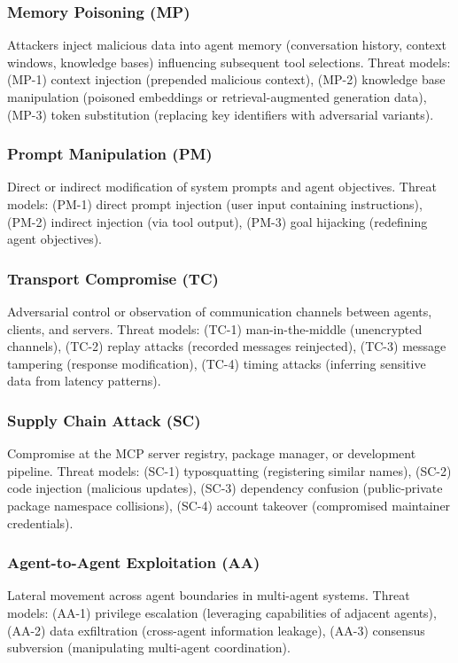 \documentclass[12pt,twocolumn,journal]{IEEEtran}
\begin{document}
\subsubsection{Memory Poisoning (MP)}
Attackers inject malicious data into agent memory (conversation history, context windows, knowledge bases) influencing subsequent tool selections. Threat models: (MP-1) context injection (prepended malicious context), (MP-2) knowledge base manipulation (poisoned embeddings or retrieval-augmented generation data), (MP-3) token substitution (replacing key identifiers with adversarial variants).

\subsubsection{Prompt Manipulation (PM)}
Direct or indirect modification of system prompts and agent objectives. Threat models: (PM-1) direct prompt injection (user input containing instructions), (PM-2) indirect injection (via tool output), (PM-3) goal hijacking (redefining agent objectives).

\subsubsection{Transport Compromise (TC)}
Adversarial control or observation of communication channels between agents, clients, and servers. Threat models: (TC-1) man-in-the-middle (unencrypted channels), (TC-2) replay attacks (recorded messages reinjected), (TC-3) message tampering (response modification), (TC-4) timing attacks (inferring sensitive data from latency patterns).

\subsubsection{Supply Chain Attack (SC)}
Compromise at the MCP server registry, package manager, or development pipeline. Threat models: (SC-1) typosquatting (registering similar names), (SC-2) code injection (malicious updates), (SC-3) dependency confusion (public-private package namespace collisions), (SC-4) account takeover (compromised maintainer credentials).

\subsubsection{Agent-to-Agent Exploitation (AA)}
Lateral movement across agent boundaries in multi-agent systems. Threat models: (AA-1) privilege escalation (leveraging capabilities of adjacent agents), (AA-2) data exfiltration (cross-agent information leakage), (AA-3) consensus subversion (manipulating multi-agent coordination).
\end{document}
